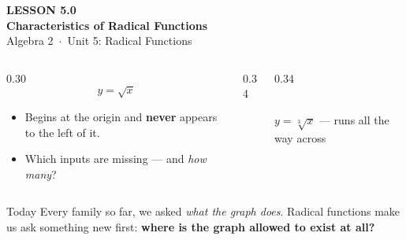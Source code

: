 \documentclass[aspectratio=169, 11pt]{beamer}
\newcommand{\lgrid}[4]{%
  \draw[step=1, linegray!45, thin] (#1,#3) grid (#2,#4);
  \draw[->, thick, charcoal] (#1,0)--(#2,0) node[below right, font=\tiny]{$x$};
  \draw[->, thick, charcoal] (0,#3)--(0,#4) node[left, font=\tiny]{$y$};}
\newcommand{\cbrtpos}[2]{\draw[very thick, forest, domain=#1:#2, samples=70, smooth]
  plot (\x,{pow(\x,1/3)});}
\newcommand{\cbrtneg}[2]{\draw[very thick, forest, domain=#1:#2, samples=70, smooth]
  plot (\x,{-pow(-1*(\x),1/3)});}
\begin{document}
{
\begin{frame}[plain]
  \vspace{2.8cm}\hspace{0.55cm}%
  \begin{minipage}{0.9\textwidth}
    {\color{goldacc}\bfseries\small LESSON 5.0}\\[0.5cm]
    {\color{white}\bfseries\LARGE Characteristics of Radical Functions}\\[1.2cm]
    {\color{forestmid}\small Algebra 2~$\cdot$~Unit 5: Radical Functions}
  \end{minipage}
\end{frame}
}

\begin{frame}[t, plain]
  \begin{columns}[T]
    \begin{column}{0.30\textwidth}
      \[ y = \sqrt{x} \]
      \begin{itemize}\setlength{\itemsep}{4pt}
        \item Begins at the origin and \textbf{never} appears to the left of it.
        \item Which inputs are missing --- and \emph{how many}?
      \end{itemize}
    \end{column}
    \begin{column}{0.34\textwidth}
      \centering
    \end{column}
    \begin{column}{0.34\textwidth}
      \centering
      \\[2pt]
      {\footnotesize $y=\sqrt[3]{x}$ --- runs all the way across}
    \end{column}
  \end{columns}
  \vspace{2pt}
  \begin{block}{Today}
    Every family so far, we asked \emph{what the graph does}. Radical functions make us ask something
    new first: \textbf{where is the graph allowed to exist at all?}
  \end{block}
\end{frame}
\end{document}
